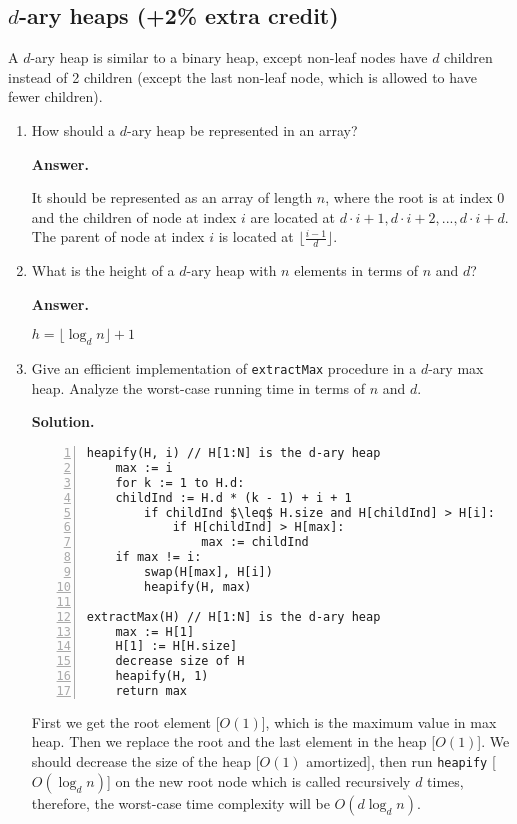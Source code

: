 \documentclass{article}
\begin{document}
\subsection{$d$-ary heaps (+2\% extra credit)}

A $d$-ary heap is similar to a binary heap, except non-leaf nodes have $d$ children instead of 2 children (except the last non-leaf node, which is allowed to have fewer children).
\begin{enumerate}
    \item How should a $d$-ary heap be represented in an array?
    
    \textbf{Answer.}

    It should be represented as an array of length $n$, where the root is at index 0 and the children of node at index $i$ are located at $d \cdot i + 1, d \cdot i + 2, ..., d \cdot i + d$. The parent of node at index $i$ is located at $\lfloor\frac{i - 1}{d}\rfloor$.
        
    \item What is the height of a $d$-ary heap with $n$ elements in terms of $n$ and $d$?

    \textbf{Answer.}

    $h = \lfloor\log_d{n}\rfloor + 1$
    
    \item Give an efficient implementation of \texttt{extractMax} procedure in a $d$-ary max heap. Analyze the worst-case running time in terms of $n$ and $d$.

    \textbf{Solution.}

\begin{lstlisting}[numbers=left,language={},style=pseudo,mathescape=true,firstnumber=1]
heapify(H, i) // H[1:N] is the d-ary heap
    max := i
    for k := 1 to H.d:
	childInd := H.d * (k - 1) + i + 1
        if childInd $\leq$ H.size and H[childInd] > H[i]:
            if H[childInd] > H[max]:
                max := childInd
    if max != i:
        swap(H[max], H[i])
        heapify(H, max)

extractMax(H) // H[1:N] is the d-ary heap
    max := H[1]
    H[1] := H[H.size]
    decrease size of H
    heapify(H, 1)
    return max
\end{lstlisting}

    First we get the root element [$O(1)$], which is the maximum value in max heap. Then we replace the root and the last element in the heap [$O(1)$]. We should decrease the size of the heap [$O(1)$ amortized], then run \texttt{heapify} [$O(\log_d{n})$] on the new root node which is called recursively $d$ times, therefore, the worst-case time complexity will be $O(d\log_d{n})$.
    

\end{enumerate}
\end{document}
